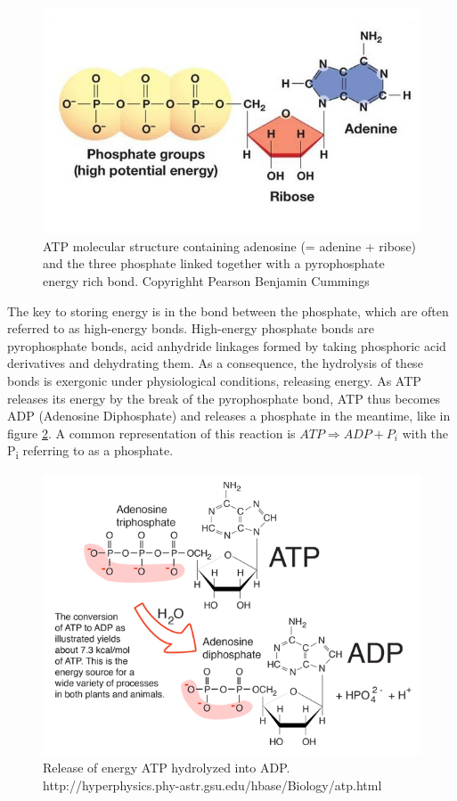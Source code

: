 \documentclass[]{book}
\theoremstyle{definition}
\theoremstyle{definition}
\theoremstyle{definition}
\theoremstyle{remark}
\begin{document}
\begin{figure}

{\centering \includegraphics[width=0.7\linewidth]{pictures/atp02a} 

}

\caption{ATP molecular structure containing adenosine (= adenine + ribose) and the three phosphate linked together with a pyrophosphate energy rich bond. Copyrighht Pearson Benjamin Cummings}\label{fig:ATPstructure}
\end{figure}

The key to storing energy is in the bond between the phosphate, which
are often referred to as high-energy bonds. High-energy phosphate bonds
are pyrophosphate bonds, acid anhydride linkages formed by taking
phosphoric acid derivatives and dehydrating them. As a consequence, the
hydrolysis of these bonds is exergonic under physiological conditions,
releasing energy. As ATP releases its energy by the break of the
pyrophosphate bond, ATP thus becomes ADP (Adenosine Diphosphate) and
releases a phosphate in the meantime, like in figure \ref{fig:ATPtoADP}.
A common representation of this reaction is
\(ATP \Rightarrow ADP + P_i\) with the P\textsubscript{i} referring to
as a phosphate.

\begin{figure}

{\centering \includegraphics[width=0.8\linewidth]{pictures/atptoadp} 

}

\caption{Release of energy ATP hydrolyzed into ADP. http://hyperphysics.phy-astr.gsu.edu/hbase/Biology/atp.html}\label{fig:ATPtoADP}
\end{figure}
\end{document}
